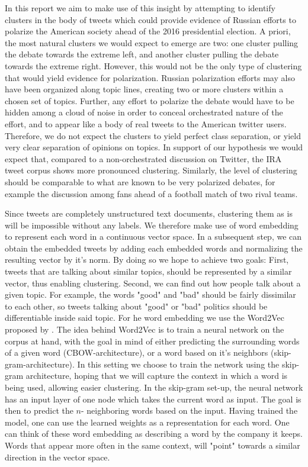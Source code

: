 \documentclass[12pt, authoryear]{elsarticle}
\begin{document}
In this report we aim to make use of this insight by attempting to identify clusters in the body of tweets which could provide evidence of Russian efforts to polarize the American society ahead of the 2016 presidential election. A priori, the most natural clusters we would expect to emerge are two: one cluster pulling the debate towards the extreme left, and another cluster pulling the debate towards the extreme right. However, this would not be the only type of clustering that would yield evidence for polarization. Russian polarization efforts may also have been organized along topic lines, creating two or more clusters within a chosen set of topics. Further, any effort to polarize the debate would have to be hidden among a cloud of noise in order to conceal orchestrated nature of the effort, and to appear like a body of real tweets to the American twitter users. Therefore, we do not expect the clusters to yield perfect class separation, or yield very clear separation of opinions on topics. In support of our hypothesis we would expect that, compared to a non-orchestrated discussion on Twitter, the IRA tweet corpus shows more pronounced clustering. Similarly, the level of clustering should be comparable to what are known to be very polarized debates, for example the discussion among fans ahead of a football match of two rival teams.

Since tweets are completely unstructured text documents, clustering them as is will be impossible without any labels. We therefore make use of word embedding to represent each word in a continuous vector space. In a subsequent step, we can obtain the embedded tweets by adding each embedded words and normalizing the resulting vector by it's norm. By doing so we hope to achieve two goals: First, tweets that are talking about similar topics, should be represented by a similar vector, thus enabling clustering. Second, we can find out how people talk about a given topic. For example, the words "good" and "bad" should be fairly dissimilar to each other, so tweets talking about "good" or "bad" politics should be differentiable inside said topic.
For he word embedding we use the Word2Vec proposed by \cite{mikolov2013efficient}. The idea behind Word2Vec is to train a neural network on the corpus at hand, with the goal in mind of either predicting the surrounding words of a given word (CBOW-architecture), or a word based on it's neighbors (skip-gram-architecture). In this setting we choose to train the network using the skip-gram architecture, hoping that we will capture the context in which a word is being used, allowing easier clustering. In the skip-gram set-up, the neural network has an input layer of one node which takes the current word as input. The goal is then to predict the $n$- neighboring words based on the input. Having trained the model, one can use the learned weights as a representation for each word. One can think of these word embedding as describing a word by the company it keeps. Words that appear more often in the same context, will "point" towards a similar direction in the vector space.
\end{document}
